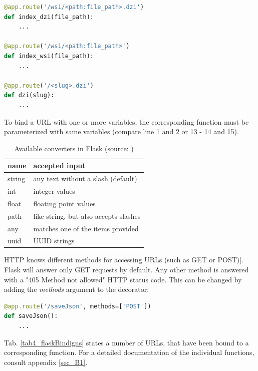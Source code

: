 \begin{lstlisting}[language=Python, frame=single]
@app.route('/wsi/<path:file_path>.dzi')
def index_dzi(file_path):
	...

@app.route('/wsi/<path:file_path>')
def index_wsi(file_path):
	...

@app.route('/<slug>.dzi')
def dzi(slug):
	...
\end{lstlisting}

To bind a URL with one or more variables, the corresponding function must be parameterized with same variables (compare line 1 and 2 or 13 - 14 and 15)\cite{web:flask}.

\begin{table}[H]
	\begin{center}
		\begin{tabular}{| l | l |}
			\hline
			\textbf{name} & \textbf{accepted input}\\ \hline
			string & any text without a slash (default)\\ \hline
			int & integer values\\ \hline
			float & floating point values\\ \hline
			path & like string, but also accepts slashes \\ \hline
			any & matches one of the items provided\\ \hline
			uuid & UUID strings\\ \hline
		\end{tabular}
		\caption{Available converters in Flask (source: \cite{web:flask})}
		\label{tab4_converter}
	\end{center}
\end{table}

HTTP knows different methods for accessing URLs (such as GET or POST)\cite{web:w3c}]. Flask will answer only GET requests by default. Any other method is answered with a "405 Method not allowed" HTTP status code\cite{web:flask}. This can be changed by adding the \emph{methods} argument to the decorator:

\begin{lstlisting}[language=Python, frame=single]
@app.route('/saveJson', methods=['POST'])
def saveJson():
	...
\end{lstlisting}

Tab. \ref{tab4_flaskBindigns} states a number of URLs, that have been bound to a corresponding function. For a detailed documentation of the individual functions, consult appendix \ref{sec_B1}.


